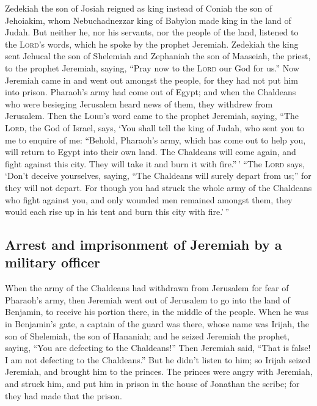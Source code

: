  Zedekiah the son of Josiah reigned as king instead of
Coniah the son of Jehoiakim, whom Nebuchadnezzar king of Babylon made
king in the land of Judah.  But neither he, nor his
servants, nor the people of the land, listened to the \textsc{Lord}'s
words, which he spoke by the prophet Jeremiah.  Zedekiah
the king sent Jehucal the son of Shelemiah and Zephaniah the son of
Maaseiah, the priest, to the prophet Jeremiah, saying, ``Pray now to the
\textsc{Lord} our God for us.''  Now Jeremiah came in and
went out amongst the people, for they had not put him into prison.
 Pharaoh's army had come out of Egypt; and when the
Chaldeans who were besieging Jerusalem heard news of them, they withdrew
from Jerusalem.  Then the \textsc{Lord}'s word came to the
prophet Jeremiah, saying,  ``The \textsc{Lord}, the God of
Israel, says, `You shall tell the king of Judah, who sent you to me to
enquire of me: ``Behold, Pharaoh's army, which has come out to help you,
will return to Egypt into their own land.  The Chaldeans
will come again, and fight against this city. They will take it and burn
it with fire.''\,'  ``The \textsc{Lord} says, `Don't
deceive yourselves, saying, ``The Chaldeans will surely depart from
us;'' for they will not depart.  For though you had
struck the whole army of the Chaldeans who fight against you, and only
wounded men remained amongst them, they would each rise up in his tent
and burn this city with fire.'\,''

\hypertarget{arrest-and-imprisonment-of-jeremiah-by-a-military-officer}{%
\subsection{Arrest and imprisonment of Jeremiah by a military
officer}\label{arrest-and-imprisonment-of-jeremiah-by-a-military-officer}}

 When the army of the Chaldeans had withdrawn from
Jerusalem for fear of Pharaoh's army,  then Jeremiah went
out of Jerusalem to go into the land of Benjamin, to receive his portion
there, in the middle of the people.  When he was in
Benjamin's gate, a captain of the guard was there, whose name was
Irijah, the son of Shelemiah, the son of Hananiah; and he seized
Jeremiah the prophet, saying, ``You are defecting to the Chaldeans!''
 Then Jeremiah said, ``That is false! I am not defecting
to the Chaldeans.'' But he didn't listen to him; so Irijah seized
Jeremiah, and brought him to the princes.  The princes
were angry with Jeremiah, and struck him, and put him in prison in the
house of Jonathan the scribe; for they had made that the prison.

